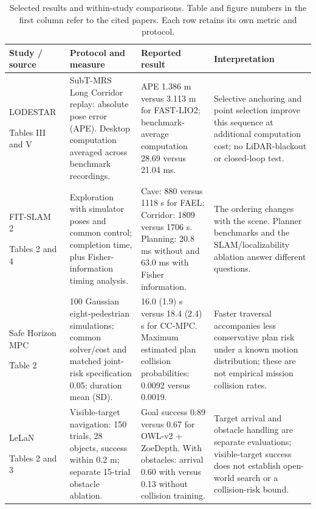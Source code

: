 \begin{table}[!t]
\centering
\caption{Selected results and within-study comparisons. Table and figure numbers in the first column refer to the cited papers. Each row retains its own metric and protocol.}
\label{tab:selected-results}
\surveytableformat
\begin{tabularx}{\linewidth}{@{}L{2.8cm}L{4.3cm}L{4.4cm}Y@{}}
\toprule
\textbf{Study / source} & \textbf{Protocol and measure} & \textbf{Reported result} & \textbf{Interpretation} \\
\midrule
LODESTAR~\cite{P_E01}\par Tables III and V & SubT-MRS Long Corridor replay: absolute pose error (APE). Desktop computation averaged across benchmark recordings. & APE 1.386 m versus 3.113 m for FAST-LIO2; benchmark-average computation 28.69 versus 21.04 ms. & Selective anchoring and point selection improve this sequence at additional computation cost; no LiDAR-blackout or closed-loop test. \\
\addlinespace[3pt]
FIT-SLAM 2~\cite{P_E13}\par Tables 2 and 4 & Exploration with simulator poses and common control; completion time, plus Fisher-information timing analysis. & Cave: 880 versus 1118 s for FAEL; Corridor: 1809 versus 1706 s. Planning: 20.8 ms without and 63.0 ms with Fisher information. & The ordering changes with the scene. Planner benchmarks and the SLAM/localizability ablation answer different questions. \\
\addlinespace[3pt]
Safe Horizon MPC~\cite{P_E25}\par Table 2 & 100 Gaussian eight-pedestrian simulations; common solver/cost and matched joint-risk specification 0.05; duration mean (SD). & 16.0 (1.9) s versus 18.4 (2.4) s for CC-MPC. Maximum estimated plan collision probabilities: 0.0092 versus 0.0019. & Faster traversal accompanies less conservative plan risk under a known motion distribution; these are not empirical mission collision rates. \\
\addlinespace[3pt]
LeLaN~\cite{P_E50}\par Tables 2 and 3 & Visible-target navigation: 150 trials, 28 objects, success within 0.2 m; separate 15-trial obstacle ablation. & Goal success 0.89 versus 0.67 for OWL-v2 + ZoeDepth. With obstacles: arrival 0.60 with versus 0.13 without collision training. & Target arrival and obstacle handling are separate evaluations; visible-target success does not establish open-world search or a collision-risk bound. \\

\end{tabularx}
\end{table}
